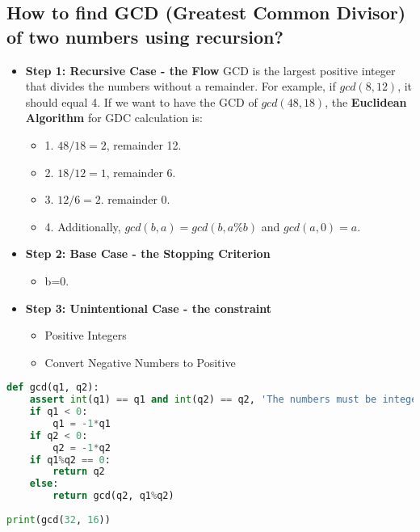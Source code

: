 \documentclass[10pt,letterpaper]{article}
\begin{document}
\subsection{How to find GCD (Greatest Common Divisor) of two numbers using recursion?}
\begin{itemize}
\item \textbf{Step 1: Recursive Case - the Flow} GCD is the largest positive integer that divides the numbers without a remainder. For example, if $gcd(8, 12)$, it should equal 4. If we want to have the GCD of $gcd(48,18)$, the \textbf{Euclidean Algorithm} for GDC calculation is:
\begin{itemize}
\item 1. $48/18=2$, remainder 12.
\item 2. $18/12=1$, remainder 6.
\item 3. $12/6=2$. remainder 0.
\item 4. Additionally, $gcd(b, a)=gcd(b, a \% b)$ and $gcd(a, 0)=a$.
\end{itemize}
\item \textbf{Step 2: Base Case - the Stopping Criterion}
\begin{itemize}
\item b=0.
\end{itemize}
\item \textbf{Step 3: Unintentional Case - the constraint}
\begin{itemize}
\item Positive Integers
\item Convert Negative Numbers to Positive
\end{itemize}
\end{itemize}
\begin{lstlisting}[language=Python, caption = Solution for GCD]
def gcd(q1, q2):
	assert int(q1) == q1 and int(q2) == q2, 'The numbers must be integer only!'
	if q1 < 0:
		q1 = -1*q1
	if q2 < 0:
		q2 = -1*q2
	if q1%q2 == 0:
		return q2
	else:
		return gcd(q2, q1%q2)
		
print(gcd(32, 16))
\end{lstlisting}
\end{document}
